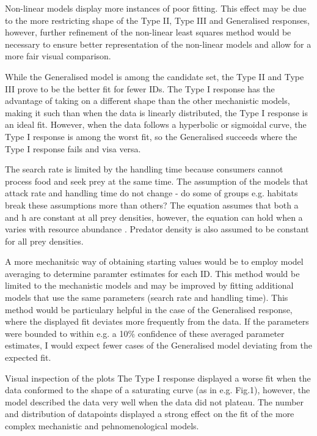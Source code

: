 \documentclass[11pt]{article}
\begin{document}
                Non-linear models display more instances of poor fitting. This effect may be due to the more restricting shape of the Type II, Type III and Generalised responses, however, further refinement of the non-linear least squares method would be necessary to ensure better representation of the non-linear models and allow for a more fair visual comparison.

                While the Generalised model is among the candidate set, the Type II and Type III prove to be the better fit for fewer IDs. The Type I response has the advantage of taking on a different shape than the other mechanistic models, making it such than when the data is linearly distributed, the Type I response is an ideal fit. However, when the data follows a hyperbolic or sigmoidal curve, the Type I response is among the worst fit, so the Generalised succeeds where the Type I response fails and visa versa.
        
                The search rate is limited by the handling time because consumers cannot process food and seek prey at the same time.
                The assumption of the models that attack rate and handling time do not change - do some of groups e.g. habitats break these assumptions more than others?
                The equation assumes that both a and h are constant at all prey densities, however, the equation can hold when a varies with resource abundance \citep{holling1959some}. Predator density is also assumed to be constant for all prey densities.

                A more mechanitsic way of obtaining starting values would be to employ model averaging to determine paramter estimates for each ID. This method would be limited to the mechanistic models and may be improved by fitting additional models that use the same parameters (search rate and handling time). This method would be particulary helpful in the case of the Generalised response, where the displayed fit deviates more frequently from the data. If the parameters were bounded to within e.g. a 10\% confidence of these averaged parameter estimates, I would expect fewer cases of the Generalised model deviating from the expected fit.

                Visual inspection of the plots
                The Type I response displayed a worse fit when the data conformed to the shape of a saturating curve (as in e.g. Fig.1), however, the model described the data very well when the data did not plateau. The number and distribution of datapoints displayed a strong effect on the fit of the more complex mechanistic and pehnomenological models.
            
\end{document}
